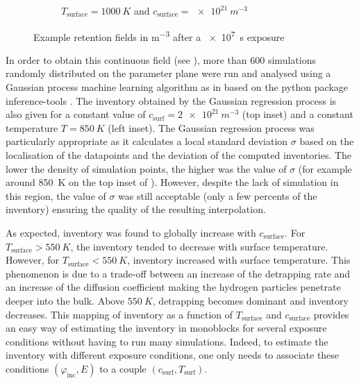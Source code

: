 \begin{figure}
\begin{subfigure}{0.5\linewidth}
        \caption{$T_\mathrm{surface} = \SI{1000}{K}$ and $c_\mathrm{surface} = \SI{e21}{m^{-3}}$}
    \end{subfigure}
    \caption{Example retention fields in \si{m^{-3}} after a \SI{e7}{s} exposure}
\end{figure}


In order to obtain this continuous field (see ), more than 600 simulations randomly distributed on the parameter plane were run and analysed using a Gaussian process machine learning algorithm  as in  based on the python package inference-tools .
The inventory obtained by the Gaussian regression process is also given for a constant value of $c_\mathrm{surf}=\SI{2e21}{m^{-3}}$ (top inset) and a constant temperature $T=\SI{850}{K}$ (left inset).
The Gaussian regression process was particularly appropriate as it calculates a local standard deviation $\sigma$ based on the localisation of the datapoints and the deviation of the computed inventories.
The lower the density of simulation points, the higher was the value of $\sigma$ (for example around \SI{850}{K} on the top inset of ).
However, despite the lack of simulation in this region, the value of $\sigma$ was still acceptable (only a few percents of the inventory) ensuring the quality of the resulting interpolation.

As expected, inventory was found to globally increase with $c_\mathrm{surface}$.
For $T_\mathrm{surface} > \SI{550}{K}$, the inventory tended to decrease with surface temperature.
However, for $T_\mathrm{surface} < \SI{550}{K}$, inventory increased with surface temperature.
This phenomenon is due to a trade-off between an increase of the detrapping rate and an increase of the diffusion coefficient making the hydrogen particles penetrate deeper into the bulk.
Above $\SI{550}{K}$, detrapping becomes dominant and inventory decreases.
This mapping of inventory as a function of $T_\mathrm{surface}$ and $c_\mathrm{surface}$ provides an easy way of estimating the inventory in monoblocks for several exposure conditions without having to run many simulations.
Indeed, to estimate the inventory with different exposure conditions, one only needs to associate these conditions $(\varphi_\mathrm{inc}, E)$ to a couple $(c_\mathrm{surf}, T_\mathrm{surf})$.

